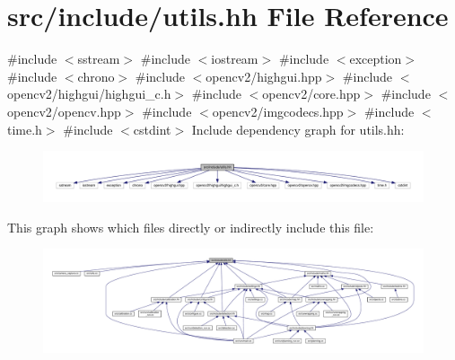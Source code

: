 \hypertarget{utils_8hh}{}\section{src/include/utils.hh File Reference}
\label{utils_8hh}
{\ttfamily \#include $<$sstream$>$}\newline
{\ttfamily \#include $<$iostream$>$}\newline
{\ttfamily \#include $<$exception$>$}\newline
{\ttfamily \#include $<$chrono$>$}\newline
{\ttfamily \#include $<$opencv2/highgui.\+hpp$>$}\newline
{\ttfamily \#include $<$opencv2/highgui/highgui\+\_\+c.\+h$>$}\newline
{\ttfamily \#include $<$opencv2/core.\+hpp$>$}\newline
{\ttfamily \#include $<$opencv2/opencv.\+hpp$>$}\newline
{\ttfamily \#include $<$opencv2/imgcodecs.\+hpp$>$}\newline
{\ttfamily \#include $<$time.\+h$>$}\newline
{\ttfamily \#include $<$cstdint$>$}\newline
Include dependency graph for utils.\+hh\+:
\nopagebreak
\begin{figure}[H]
\begin{center}
\leavevmode
\includegraphics[width=350pt]{utils_8hh__incl}
\end{center}
\end{figure}
This graph shows which files directly or indirectly include this file\+:
\nopagebreak
\begin{figure}[H]
\begin{center}
\leavevmode
\includegraphics[width=350pt]{utils_8hh__dep__incl}
\end{center}
\end{figure}
